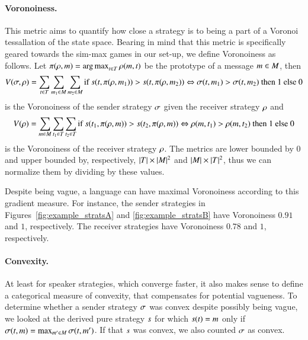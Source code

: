 \paragraph{Voronoiness.}
This metric aims to quantify how close a strategy is to being a part
of a Voronoi tessallation of the state space. Bearing in mind that
this metric is specifically geared towards the sim-max games in our
set-up, we define Voronoiness as follows. Let $\pi(\rho, m) =
\operatorname*{arg\,max}_{t \in T}\rho(m,t)$ be the prototype
of a message $m \in M$, then
\begin{multline*}
  V(\sigma, \rho) = \sum_{t \in T} \sum_{m_1 \in
    M} \sum_{m_2 \in M} \textrm{if } s(t,
  \pi(\rho, m_1)) > s(t, \pi(\rho, m_2)) \Leftrightarrow
  \sigma(t, m_1) > \sigma(t, m_2) \textrm{ then
  } 1 \textrm{ else } 0 
\end{multline*}
is the Voronoiness of the sender strategy $\sigma$ given the receiver
strategy $\rho$ and
\begin{align*}
  V(\rho) = \sum_{m \in M} \sum_{t_1 \in T}
  \sum_{t_2 \in T} \textrm{if } s(t_1, \pi(\rho,
  m)) > s(t_2, \pi(\rho, m)) \Leftrightarrow \rho(m,
  t_1) > \rho(m, t_2) \textrm{ then } 1 \textrm{
    else } 0
\end{align*}
is the Voronoiness of the receiver strategy $\rho$.  The metrics
are lower bounded by $0$ and upper bounded by, respectively,
$|T| \times |M|^2$ and $|M| \times |T|^2$,
thus we can normalize them by dividing by these values.

Despite being vague, a language can have maximal Voronoiness according
to this gradient measure. For instance, the sender strategies in
Figures~\ref{fig:example_stratsA} and \ref{fig:example_stratsB} have
Voronoiness $0.91$ and $1$, respectively. The receiver strategies have
Voronoiness $0.78$ and $1$, respectively.

\paragraph{Convexity.} At least for speaker strategies, which converge
faster, it also makes sense to define a categorical measure of
convexity, that compensates for potential vagueness. To determine
whether a sender strategy $\sigma$ was convex despite possibly being
vague, we looked at the derived pure strategy $s$ for which
$s(t) = m$ only if $\sigma(t,m) =
\max_{m' \in M} \sigma(t,m')$. If that $s$
was convex, we also counted $\sigma$ as convex.

